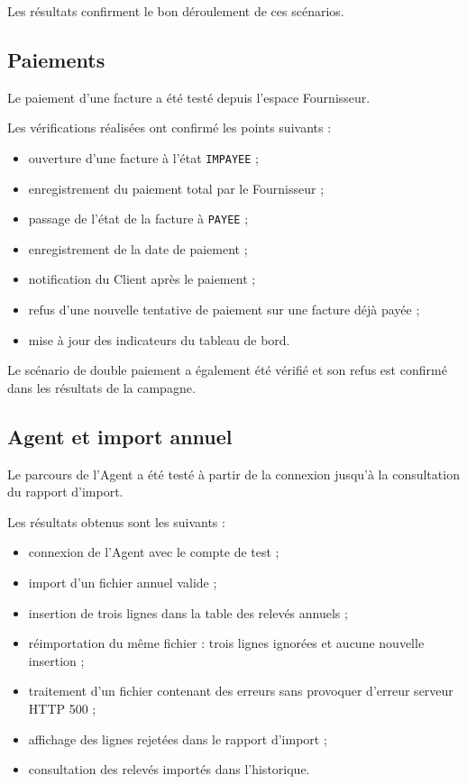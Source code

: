 Les résultats confirment le bon déroulement de ces scénarios.

\subsection{Paiements}

Le paiement d'une facture a été testé depuis l'espace Fournisseur.

Les vérifications réalisées ont confirmé les points suivants :
\begin{itemize}
    \item ouverture d'une facture à l'état \texttt{IMPAYEE} ;
    \item enregistrement du paiement total par le Fournisseur ;
    \item passage de l'état de la facture à \texttt{PAYEE} ;
    \item enregistrement de la date de paiement ;
    \item notification du Client après le paiement ;
    \item refus d'une nouvelle tentative de paiement sur une facture déjà payée ;
    \item mise à jour des indicateurs du tableau de bord.
\end{itemize}

Le scénario de double paiement a également été vérifié et son refus est confirmé dans les résultats de la campagne.

\subsection{Agent et import annuel}

Le parcours de l'Agent a été testé à partir de la connexion jusqu'à la consultation du rapport d'import.

Les résultats obtenus sont les suivants :
\begin{itemize}
    \item connexion de l'Agent avec le compte de test ;
    \item import d'un fichier annuel valide ;
    \item insertion de trois lignes dans la table des relevés annuels ;
    \item réimportation du même fichier : trois lignes ignorées et aucune nouvelle insertion ;
    \item traitement d'un fichier contenant des erreurs sans provoquer d'erreur serveur HTTP 500 ;
    \item affichage des lignes rejetées dans le rapport d'import ;
    \item consultation des relevés importés dans l'historique.
\end{itemize}

